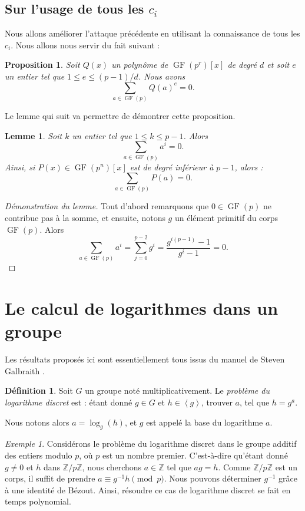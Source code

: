 \documentclass[a4paper, titlepage]{article}
\newtheorem{lemm}[theo]{Lemme}
\newtheorem{prop}[theo]{Proposition}
\theoremstyle{definition}
\newtheorem{defi}[theo]{Définition}
\theoremstyle{remark}
\newtheorem{exem}[theo]{Exemple}
\def\Z{\mathbb Z}
\def\gf{\operatorname{GF}}
\def\gen #1{\left\langle#1\right\rangle}
\begin{document}
\subsection{Sur l'usage de tous les $c_i$}

Nous allons améliorer l'attaque précédente en utilisant la connaissance de tous les $c_i$. Nous allons nous servir du fait suivant :

\begin{prop}
Soit $Q(x)$ un polynôme de $\gf(p^r)[x]$ de degré $d$ et soit $e$ un entier tel que $1 \leqslant e \leqslant (p-1)/d$. Nous avons $$\sum_{a \in \gf(p)} Q(a)^e = 0.$$
\end{prop}

Le lemme qui suit va permettre de démontrer cette proposition.

\begin{lemm}
Soit $k$ un entier tel que $1 \leqslant k \leqslant p-1$. Alors
$$\sum_{a\in\gf(p)} a^i = 0.$$
Ainsi, si $P(x) \in \gf(p^n)[x]$ est de degré inférieur à $p-1$, alors : $$\sum_{a\in\gf(p)} P(a) = 0.$$
\end{lemm}

\begin{proof}[Démonstration du lemme]
Tout d'abord remarquons que $0 \in \gf(p)$ ne contribue pas à la somme, et ensuite, notons $g$ un élément primitif du corps $\gf(p)$. Alors
$$\sum_{a\in\gf(p)} a^i = \sum_{j=0}^{p-2} g^i = \frac{g^{i(p-1)} - 1}{g^{i} - 1} = 0.$$
\end{proof}

\section{Le calcul de logarithmes dans un groupe}\label{logDiscret}

Les résultats proposés ici sont essentiellement tous issus du manuel de Steven Galbraith \cite[section 13 et 14, pp. 246 à 297]{galbraith2012}.

\begin{defi}\label{defLogDiscret}
Soit $G$ un groupe noté multiplicativement. Le \textit{problème du logarithme discret} est : étant donné $g\in G$ et $h \in \gen{g}$, trouver $a$, tel que $h=g^a$.\end{defi}
Nous notons alors $a=\log_g(h)$, et $g$ est appelé la base du logarithme $a$.


\begin{exem}
Considérons le problème du logarithme discret dans le groupe additif des entiers modulo $p$, où $p$ est un nombre premier. C'est-à-dire qu'étant donné $g \neq 0$ et $h$ dans $\Z/p\Z$, nous cherchons $a \in \Z$ tel que $ag = h$. Comme $\Z/p\Z$ est un corps, il suffit de prendre $a \equiv g^{-1}h \pmod{p}$. Nous pouvons déterminer $g^{-1}$ grâce à une identité de Bézout. Ainsi, résoudre ce cas de logarithme discret se fait en temps polynomial.
\end{exem}
\end{document}
